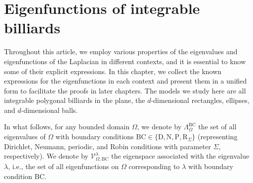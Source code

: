 \documentclass{amsart}
\theoremstyle{definition}
\theoremstyle{remark}
\numberwithin{equation}{section}
\theoremstyle{definition}
\theoremstyle{remark}
\begin{document}
\section{Eigenfunctions of integrable billiards}\label{formulas}

Throughout this article, we employ various properties of the eigenvalues and eigenfunctions of the Laplacian in different contexts, and it is essential to know some of their explicit expressions. In this chapter, we collect the known expressions for the eigenfunctions in each context and present them in a unified form to facilitate the proofs in later chapters. The models we study here are all integrable polygonal billiards in the plane, the $d$-dimensional rectangles, ellipses, and $d$-dimensional balls.

In what follows, for any bounded domain $\Omega$, we denote by $\Lambda_{\Omega}^{\mathrm{BC}}$ the set of all eigenvalues of  $\Omega$ with boundary conditions $\mathrm{BC} \in \{\mathrm{D},\mathrm{N},\mathrm{P},\mathrm{R}_\Sigma\}$ (representing Dirichlet, Neumann, periodic, and Robin conditions with parameter $\Sigma$, respectively). We denote by $\mathcal{V}_{\Omega,\mathrm{BC}}^\lambda$ the eigenspace associated with the eigenvalue $\lambda$, i.e., the set of all eigenfunctions on $\Omega$ corresponding to $\lambda$ with boundary condition $\mathrm{BC}$.

 
\end{document}
